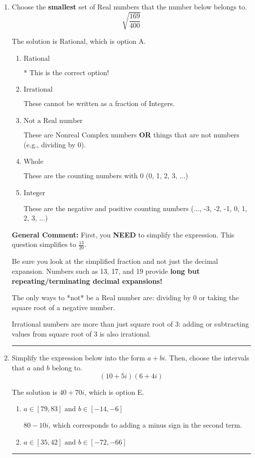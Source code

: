 \documentclass{extbook}[14pt]
\newcommand{\litem}[1]{\item #1

\rule{\textwidth}{0.4pt}}
\begin{document}
\begin{enumerate}\litem{
Choose the \textbf{smallest} set of Real numbers that the number below belongs to.
\[ \sqrt{\frac{169}{400}} \]

The solution is \( \text{Rational} \), which is option A.\begin{enumerate}[label=\Alph*.]
\item \( \text{Rational} \)

* This is the correct option!
\item \( \text{Irrational} \)

These cannot be written as a fraction of Integers.
\item \( \text{Not a Real number} \)

These are Nonreal Complex numbers \textbf{OR} things that are not numbers (e.g., dividing by 0).
\item \( \text{Whole} \)

These are the counting numbers with 0 (0, 1, 2, 3, ...)
\item \( \text{Integer} \)

These are the negative and positive counting numbers (..., -3, -2, -1, 0, 1, 2, 3, ...)
\end{enumerate}

\textbf{General Comment:} First, you \textbf{NEED} to simplify the expression. This question simplifies to $\frac{13}{20}$. 
 
 Be sure you look at the simplified fraction and not just the decimal expansion. Numbers such as 13, 17, and 19 provide \textbf{long but repeating/terminating decimal expansions!} 
 
 The only ways to *not* be a Real number are: dividing by 0 or taking the square root of a negative number. 
 
 Irrational numbers are more than just square root of 3: adding or subtracting values from square root of 3 is also irrational.
}
\litem{
Simplify the expression below into the form $a+bi$. Then, choose the intervals that $a$ and $b$ belong to.
\[ (10 + 5 i)(6 + 4 i) \]

The solution is \( 40 + 70 i \), which is option E.\begin{enumerate}[label=\Alph*.]
\item \( a \in [79, 83] \text{ and } b \in [-14, -6] \)

 $80 - 10 i$, which corresponds to adding a minus sign in the second term.
\item \( a \in [35, 42] \text{ and } b \in [-72, -66] \)


\end{enumerate}}
\end{enumerate}
\end{document}

